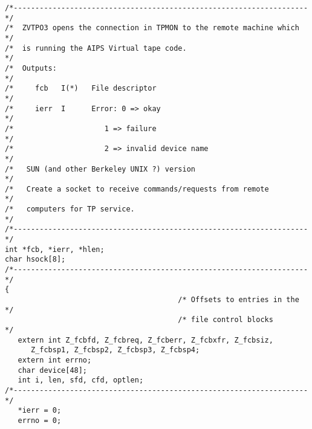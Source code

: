 \begin{center}
\begin{verbatim}
/*--------------------------------------------------------------------*/
/*  ZVTPO3 opens the connection in TPMON to the remote machine which  */
/*  is running the AIPS Virtual tape code.                            */
/*  Outputs:                                                          */
/*     fcb   I(*)   File descriptor                                   */
/*     ierr  I      Error: 0 => okay                                  */
/*                     1 => failure                                   */
/*                     2 => invalid device name                       */
/*   SUN (and other Berkeley UNIX ?) version                          */
/*   Create a socket to receive commands/requests from remote         */
/*   computers for TP service.                                        */
/*--------------------------------------------------------------------*/
int *fcb, *ierr, *hlen;
char hsock[8];
/*--------------------------------------------------------------------*/
{
                                        /* Offsets to entries in the  */
                                        /* file control blocks        */
   extern int Z_fcbfd, Z_fcbreq, Z_fcberr, Z_fcbxfr, Z_fcbsiz,
      Z_fcbsp1, Z_fcbsp2, Z_fcbsp3, Z_fcbsp4;
   extern int errno;
   char device[48];
   int i, len, sfd, cfd, optlen;
/*--------------------------------------------------------------------*/
   *ierr = 0;
   errno = 0;


\end{verbatim}
\end{center}

